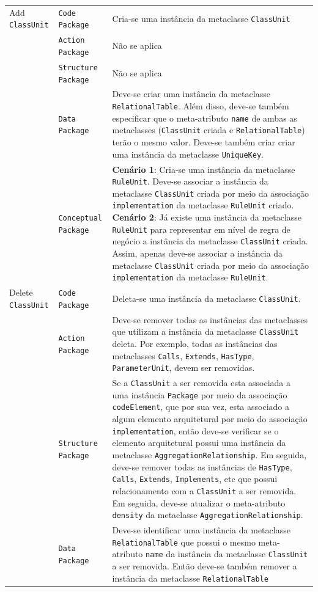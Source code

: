 \begin{longtable}{ | m{1.9cm} | m{3.57cm}| m{9.3cm} | }
 Add \texttt{ClassUnit} & \texttt{Code Package} & Cria-se uma instância da metaclasse \texttt{ClassUnit}\tabularnewline
\cline{2-3} 
\cline{2-3} 
 & \texttt{Action Package} & Não se aplica \tabularnewline
 \cline{2-3} 
 & \texttt{Structure Package} & Não se aplica \tabularnewline
\cline{2-3} 
 & \texttt{Data Package} & Deve-se criar uma instância da metaclasse \texttt{RelationalTable}. Além disso, deve-se também especificar que o meta-atributo \texttt{name} de ambas as metaclasses (\texttt{ClassUnit} criada e \texttt{RelationalTable}) terão o mesmo valor. Deve-se também criar criar uma instância da metaclasse \texttt{UniqueKey}. \tabularnewline
\cline{2-3} 
 & \texttt{Conceptual Package} & \textbf{Cenário 1}: Cria-se uma instância da metaclasse \texttt{RuleUnit}. Deve-se associar a instância da metaclasse \texttt{ClassUnit} criada por meio da associação \texttt{implementation} da metaclasse \texttt{RuleUnit} criado. \textbf{Cenário 2}: Já existe uma instância da metaclasse \texttt{RuleUnit} para representar em nível de regra de negócio a instância da metaclasse \texttt{ClassUnit} criada. Assim, apenas deve-se associar a instância da metaclasse \texttt{ClassUnit} criada por meio da associação \texttt{implementation} da metaclasse \texttt{RuleUnit}. \tabularnewline
\hline 
 Delete \texttt{ClassUnit} & \texttt{Code Package} & Deleta-se uma instância da metaclasse \texttt{ClassUnit}.\tabularnewline
\cline{2-3} 
& \texttt{Action Package} & Deve-se remover todas as instâncias das metaclasses que utilizam a instância da metaclasse \texttt{ClassUnit} deleta. Por exemplo, todas as instâncias das metaclasses \texttt{Calls}, \texttt{Extends}, \texttt{HasType}, \texttt{ParameterUnit}, devem ser removidas. \tabularnewline
\cline{2-3}
& \texttt{Structure Package} & Se a \texttt{ClassUnit} a ser removida esta associada a uma instância \texttt{Package} por meio da associação \texttt{codeElement}, que por sua vez, esta associado a algum elemento arquitetural por meio do associação \texttt{implementation}, então deve-se verificar se o elemento arquitetural possui uma instância da metaclasse \texttt{AggregationRelationship}. Em seguida, deve-se remover todas as instâncias de \texttt{HasType}, \texttt{Calls}, \texttt{Extends}, \texttt{Implements}, etc que possui relacionamento com a \texttt{ClassUnit} a ser removida. Em seguida, deve-se atualizar o meta-atributo \texttt{density} da metaclasse \texttt{AggregationRelationship}. \tabularnewline
\cline{2-3}
& \texttt{Data Package} & Deve-se identificar uma instância da metaclasse \texttt{RelationalTable} que possui o mesmo meta-atributo \texttt{name} da instância da metaclasse \texttt{ClassUnit} a ser removida. Então deve-se também remover a instância da metaclasse \texttt{RelationalTable} \tabularnewline

\end{longtable}
